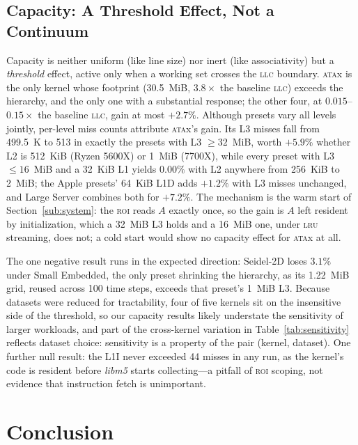 \documentclass[12pt]{article}
\begin{document}
\subsection{Capacity: A Threshold Effect, Not a Continuum}\label{sub:capacity}

Capacity is neither uniform (like line size) nor inert (like associativity) but a
\textit{threshold} effect, active only when a working set crosses the
\textsc{llc} boundary. \textsc{ata}x is the only kernel whose footprint
(30.5~MiB, \(3.8\times\) the baseline \textsc{llc}) exceeds the hierarchy, and the
only one with a substantial response; the other four, at
\(0.015\)--\(0.15\times\) the baseline \textsc{llc}, gain at most \(+2.7\%\).
Although presets vary all levels jointly, per-level miss counts attribute
\textsc{ata}x's gain. Its L3 misses fall from 499.5~K to 513 in exactly the
presets with L3 \(\geq 32\)~MiB, worth \(+5.9\%\) whether L2 is 512~KiB (Ryzen
5600X) or 1~MiB (7700X), while every preset with L3 \(\leq 16\)~MiB and a 32~KiB
L1 yields \(0.00\%\) with L2 anywhere from 256~KiB to 2~MiB; the Apple presets'
64~KiB L1D adds \(+1.2\%\) with L3 misses unchanged, and Large Server combines
both for \(+7.2\%\). The mechanism is the warm start of Section~\ref{sub:system}:
the \textsc{roi} reads \(A\) exactly once, so the gain is \(A\) left resident by
initialization, which a 32~MiB L3 holds and a 16~MiB one, under \textsc{lru}
streaming, does not; a cold start would show no capacity effect for
\textsc{ata}x at all.

The one negative result runs in the expected direction: Seidel-2D loses
\(3.1\%\) under Small Embedded, the only preset shrinking the hierarchy, as its
1.22~MiB grid, reused across 100 time steps, exceeds that preset's 1~MiB L3.
Because datasets were reduced for tractability, four of five kernels sit on the
insensitive side of the threshold, so our capacity results likely understate the
sensitivity of larger workloads, and part of the cross-kernel variation in
Table~\ref{tab:sensitivity} reflects dataset choice: sensitivity is a property
of the pair (kernel, dataset). One
further null result: the L1I never exceeded 44 misses in any run, as the
kernel's code is resident before \textit{libm5} starts collecting---a pitfall of
\textsc{roi} scoping, not evidence that instruction fetch is unimportant.

\section{Conclusion}\label{sec:conclusion}
\end{document}
